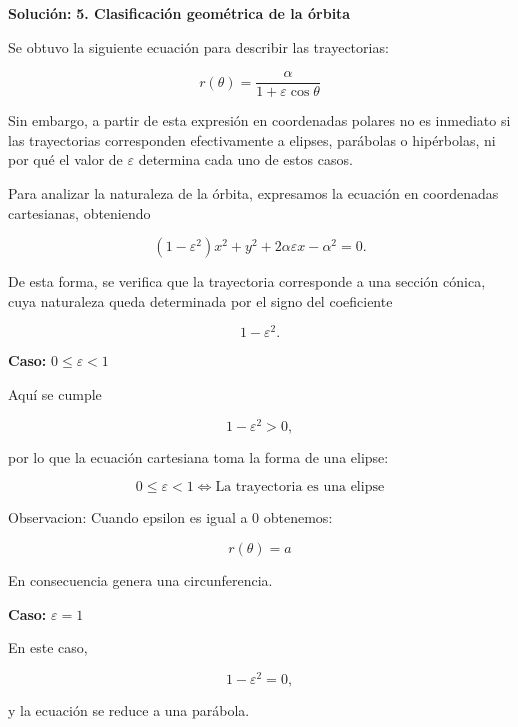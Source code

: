 \documentclass[10pt,a4paper]{article}
\newenvironment{solution}{\par\noindent\textbf{Solución: } }{}
\begin{document}
\begin{solution}
\noindent
\textbf{\large 5. Clasificación geométrica de la órbita}

\vspace{0.2cm}


Se obtuvo la siguiente ecuación para describir las trayectorias:

\[
r(\theta)
=
\frac{\alpha}{1+\varepsilon\cos\theta}
\]

Sin embargo, a partir de esta expresión en coordenadas polares no es inmediato si las trayectorias corresponden efectivamente a elipses, parábolas o hipérbolas, ni por qué el valor de \(\varepsilon\) determina cada uno de estos casos.

Para analizar la naturaleza de la órbita, expresamos la ecuación en coordenadas cartesianas, obteniendo

\[
(1-\varepsilon^2)x^2
+
y^2
+
2\alpha\varepsilon x
-
\alpha^2
=
0.
\]

De esta forma, se verifica que la trayectoria corresponde a una sección cónica, cuya naturaleza queda determinada por el signo del coeficiente

\[
1-\varepsilon^2.
\]


\vspace{0.3cm}

\noindent
\textbf{Caso:} \(0\leq\varepsilon<1\)

\vspace{0.2cm}

Aquí se cumple

\[
1-\varepsilon^2>0,
\]

por lo que la ecuación cartesiana toma la forma de una elipse:

\[
\boxed{
0\leq\varepsilon<1 \iff \text{La trayectoria es una elipse}
}
\]


\vspace{0.5 cm}

Observacion: Cuando epsilon es igual a 0 obtenemos:

\[
r(\theta) = a
\]

En consecuencia genera una circunferencia.



\vspace{0.3cm}

\noindent
\textbf{Caso:} \(\varepsilon=1\)

\vspace{0.2cm}

En este caso,

\[
1-\varepsilon^2=0,
\]

y la ecuación se reduce a una parábola.


\end{solution}
\end{document}

